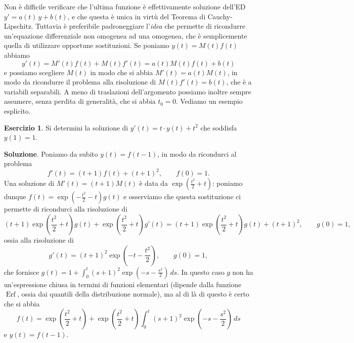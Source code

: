 \documentclass[a4paper,twoside]{article}
\theoremstyle{definition}
\newtheorem{ex}[theorem]{Esercizio}
\numberwithin{theorem}{section}
\begin{document}
Non è difficile verificare che l'ultima funzione è effettivamente soluzione dell'ED $y'=a(t)\,y+b(t)$, e che questa è unica in virtù del Teorema di Cauchy-Lipschitz. Tuttavia è preferibile padroneggiare l'\emph{idea} che permette di ricondurre un'equazione differenziale non omogenea ad una omogenea, che è semplicemente quella di utilizzare opportune sostituzioni. Se poniamo $y(t)=M(t)f(t)$ abbiamo 
$$y'(t)=M'(t)f(t)+M(t)f'(t)=a(t)M(t)f(t)+b(t)$$
e possiamo scegliere $M(t)$ in modo che si abbia $M'(t)=a(t)M(t)$, in modo da ricondurre il problema alla risoluzione di $M(t)f'(t)=b(t)$, che è a variabili separabili. A meno di traslazioni dell'argomento possiamo inoltre sempre assumere, senza perdita di generalità, che si abbia $t_0=0$. Vediamo un esempio esplicito.
\begin{ex} Si determini la soluzione di $y'(t) = t\cdot y(t)+t^2$ che soddisfa $y(1)=1$. 
\end{ex}
\textbf{Soluzione}. Poniamo da subito $y(t)=f(t-1)$, in modo da ricondurci al problema 
$$ f'(t) = (t+1) f(t)+(t+1)^2,\qquad f(0)=1.$$
Una soluzione di $M'(t)=(t+1)M(t)$ è data da $\exp\left(\frac{t^2}{2}+t\right)$: poniamo dunque $f(t)=\exp\left(-\frac{t^2}{2}-t\right)g(t)$ e osserviamo che questa sostituzione ci permette di ricondurci alla risoluzione di 
$$ (t+1)\exp\left(\frac{t^2}{2}+t\right)g(t) + \exp\left(\frac{t^2}{2}+t\right)g'(t) = (t+1)\exp\left(\frac{t^2}{2}+t\right)g(t)+(t+1)^2,\qquad g(0)=1,$$
ossia alla risoluzione di 
$$  g'(t) = (t+1)^2 \exp\left(-t-\frac{t^2}{2}\right),\qquad g(0)=1,$$
che fornisce $g(t)=1+\int_{0}^{t}(s+1)^2 \exp\left(-s-\frac{s^2}{2}\right)\,ds$. In questo caso $g$ non ha un'espressione chiusa in termini di funzioni elementari (dipende dalla funzione $\operatorname{Erf}$, ossia dai quantili della distribuzione normale), ma al di là di questo è certo che si abbia 
$$f(t) = \exp\left(\frac{t^2}{2}+t\right)+\exp\left(\frac{t^2}{2}+t\right)\int_{0}^{t}(s+1)^2 \exp\left(-s-\frac{s^2}{2}\right)\,ds$$
e $y(t)=f(t-1)$.
\end{document}
